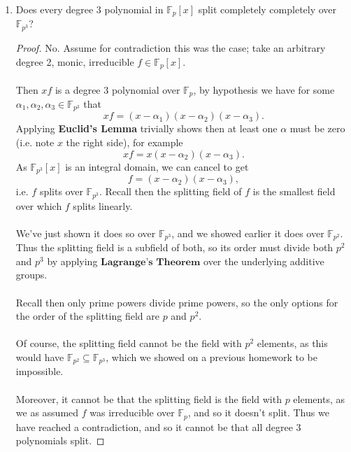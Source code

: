\documentclass[12pt]{article}
\newenvironment{ex}[2][Exercise]{\begin{trivlist}
\item[\hskip \labelsep {\bfseries #1}\hskip \labelsep {\bfseries #2.}]}{\end{trivlist}}
\begin{document}
\begin{ex}{2}
\begin{enumerate}[label=(\alph*)]
\begin{proof}
            Following the mechanics outlined in Problem 3 (b.) then, we conclude 
            $$f = (x - \alpha_1)(x - \alpha_2)(x - \alpha_3),$$
            i.e. $f$ splits completely over $\mathbb{F}_{p^3}$.
        \end{proof}
        \item Does every degree 3 polynomial in $\mathbb{F}_{p}[x]$ split completely completely over $\mathbb{F}_{p^3}$?
        \begin{proof}
            No. Assume for contradiction this was the case; take an arbitrary degree 2, monic, irreducible $f \in \mathbb{F}_p[x]$. \\ \\
            Then $xf$ is a degree 3 polynomial over $\mathbb{F}_p$, by hypothesis we have for some $\alpha_1, \alpha_2, \alpha_3 \in \mathbb{F}_{p^3}$ that 
            $$xf = (x - \alpha_1)(x - \alpha_2)(x - \alpha_3).$$
            Applying \textbf{Euclid's Lemma} trivially shows then at least one $\alpha$ must be zero (i.e. note $x$ the right side), for example 
            $$xf = x(x - \alpha_2)(x - \alpha_3).$$ 
            As $\mathbb{F}_{p^3}[x]$ is an integral domain, we can cancel to get 
            $$f = (x - \alpha_2)(x - \alpha_3),$$
            i.e. $f$ splits over $\mathbb{F}_{p^3}$. Recall then the splitting field of $f$ is the smallest field over which $f$ splits linearly. \\ \\
            We've just shown it does so over $\mathbb{F}_{p^3}$, and we showed earlier it does over $\mathbb{F}_{p^2}$. Thus the splitting field is a subfield of both, so its order must divide both $p^2$ and $p^3$ by applying $\textbf{Lagrange's Theorem}$ over the underlying additive groups. \\ \\
            Recall then only prime powers divide prime powers, so the only options for the order of the splitting field are $p$ and $p^2$. \\ \\
            Of course, the splitting field cannot be the field with $p^2$ elements, as this would have $\mathbb{F}_{p^2} \subseteq \mathbb{F}_{p^3}$, which we showed on a previous homework to be impossible. \\ \\
            Moreover, it cannot be that the splitting field is the field with $p$ elements, as we as assumed $f$ was irreducible over $\mathbb{F}_p$, and so it doesn't split. Thus we have reached a contradiction, and so it cannot be that all degree 3 polynomials split.
        \end{proof}
    \end{enumerate}
\end{ex}
\end{document}
